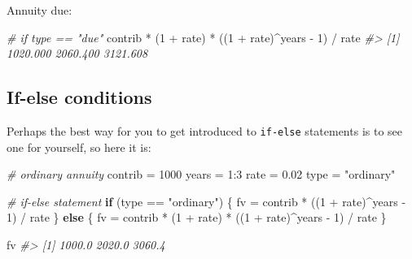 \documentclass[
]{book}
\newenvironment{Shaded}{\begin{snugshade}}{\end{snugshade}}
\newcommand{\CommentTok}[1]{\textcolor[rgb]{0.56,0.35,0.01}{\textit{#1}}}
\newcommand{\ControlFlowTok}[1]{\textcolor[rgb]{0.13,0.29,0.53}{\textbf{#1}}}
\newcommand{\DecValTok}[1]{\textcolor[rgb]{0.00,0.00,0.81}{#1}}
\newcommand{\FloatTok}[1]{\textcolor[rgb]{0.00,0.00,0.81}{#1}}
\newcommand{\NormalTok}[1]{#1}
\newcommand{\OtherTok}[1]{\textcolor[rgb]{0.56,0.35,0.01}{#1}}
\newcommand{\SpecialCharTok}[1]{\textcolor[rgb]{0.00,0.00,0.00}{#1}}
\newcommand{\StringTok}[1]{\textcolor[rgb]{0.31,0.60,0.02}{#1}}
\begin{document}
Annuity due:

\begin{Shaded}
\begin{Highlighting}[]
\CommentTok{\# if type == "due"}
\NormalTok{contrib }\SpecialCharTok{*}\NormalTok{ (}\DecValTok{1} \SpecialCharTok{+}\NormalTok{ rate) }\SpecialCharTok{*}\NormalTok{ ((}\DecValTok{1} \SpecialCharTok{+}\NormalTok{ rate)}\SpecialCharTok{\^{}}\NormalTok{years }\SpecialCharTok{{-}} \DecValTok{1}\NormalTok{) }\SpecialCharTok{/}\NormalTok{ rate}
\CommentTok{\#\textgreater{} [1] 1020.000 2060.400 3121.608}
\end{Highlighting}
\end{Shaded}

\hypertarget{if-else-conditions}{%
\subsection{If-else conditions}\label{if-else-conditions}}

Perhaps the best way for you to get introduced to \texttt{if-else} statements is to
see one for yourself, so here it is:

\begin{Shaded}
\begin{Highlighting}[]
\CommentTok{\# ordinary annuity}
\NormalTok{contrib }\OtherTok{=} \DecValTok{1000}
\NormalTok{years }\OtherTok{=} \DecValTok{1}\SpecialCharTok{:}\DecValTok{3}
\NormalTok{rate }\OtherTok{=} \FloatTok{0.02}
\NormalTok{type }\OtherTok{=} \StringTok{"ordinary"}

\CommentTok{\# if{-}else statement}
\ControlFlowTok{if}\NormalTok{ (type }\SpecialCharTok{==} \StringTok{"ordinary"}\NormalTok{) \{}
\NormalTok{  fv }\OtherTok{=}\NormalTok{ contrib }\SpecialCharTok{*}\NormalTok{ ((}\DecValTok{1} \SpecialCharTok{+}\NormalTok{ rate)}\SpecialCharTok{\^{}}\NormalTok{years }\SpecialCharTok{{-}} \DecValTok{1}\NormalTok{) }\SpecialCharTok{/}\NormalTok{ rate}
\NormalTok{\} }\ControlFlowTok{else}\NormalTok{ \{}
\NormalTok{  fv }\OtherTok{=}\NormalTok{ contrib }\SpecialCharTok{*}\NormalTok{ (}\DecValTok{1} \SpecialCharTok{+}\NormalTok{ rate) }\SpecialCharTok{*}\NormalTok{ ((}\DecValTok{1} \SpecialCharTok{+}\NormalTok{ rate)}\SpecialCharTok{\^{}}\NormalTok{years }\SpecialCharTok{{-}} \DecValTok{1}\NormalTok{) }\SpecialCharTok{/}\NormalTok{ rate}
\NormalTok{\}}

\NormalTok{fv}
\CommentTok{\#\textgreater{} [1] 1000.0 2020.0 3060.4}
\end{Highlighting}
\end{Shaded}
\end{document}
